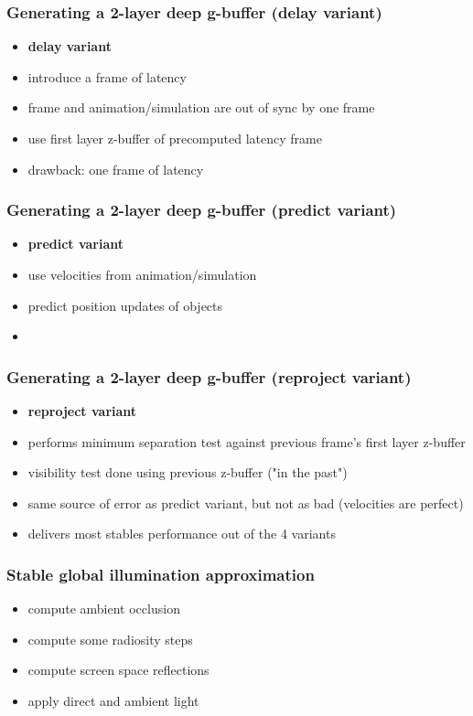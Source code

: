 \documentclass[aspectratio=169]{beamer}
\begin{document}
	\begin{frame}
		\frametitle{Generating a 2-layer deep g-buffer (delay variant)}
		\begin{itemize}
			\item \textbf{delay variant}
			\item introduce a frame of latency
			\item frame and animation/simulation are out of sync by one frame
			\item use first layer z-buffer of precomputed latency frame 
			\item drawback: one frame of latency
		\end{itemize}
	\end{frame}	

	\begin{frame}
		\frametitle{Generating a 2-layer deep g-buffer (predict variant)}
		\begin{itemize}
			\item \textbf{predict variant}
			\item use velocities from animation/simulation
			\item predict position updates of objects
			\item 
		\end{itemize}
	\end{frame}	

	\begin{frame}
		\frametitle{Generating a 2-layer deep g-buffer (reproject variant)}
		\begin{itemize}
			\item \textbf{reproject variant}
			\item performs minimum separation test against previous frame's first layer z-buffer
			\item visibility test done using previous z-buffer ("in the past")
			\item same source of error as predict variant, but not as bad (velocities are perfect)
			\item delivers most stables performance out of the 4 variants
			
		\end{itemize}
	\end{frame}	

	\begin{frame}
		\frametitle{Stable global illumination approximation}
		\begin{itemize}
			\item compute ambient occlusion 
			\item compute some radiosity steps
			\item compute screen space reflections
			\item apply direct and ambient light
		\end{itemize}
	\end{frame}	
\end{document}
